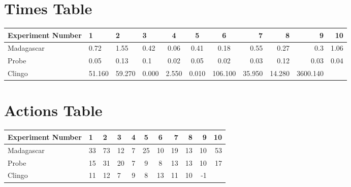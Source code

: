 \documentclass[8pt]{article}
\begin{document}
\begin{landscape}
\section{Times Table}\begin{tabular}{ | l | l | l | l | c | c | c | r | r | r | r | }\hline
Experiment Number & 1 & 2 & 3 & 4 & 5 & 6 & 7 & 8 & 9 & 10\\  \hline
Madagascar & 0.72 & 1.55 & 0.42 & 0.06 & 0.41 & 0.18 & 0.55 & 0.27 & 0.3 & 1.06\\  \hline
Probe & 0.05 & 0.13 & 0.1 & 0.02 & 0.05 & 0.02 & 0.03 & 0.12 & 0.03 & 0.04\\  \hline
Clingo & 51.160 & 59.270 & 0.000 & 2.550 & 0.010 & 106.100 & 35.950 & 14.280 & 3600.140\\  \hline
\end{tabular}
\section{Actions Table}\begin{tabular}{ | l | l | l | l | c | c | c | r | r | r | r | }\hline
Experiment Number & 1 & 2 & 3 & 4 & 5 & 6 & 7 & 8 & 9 & 10\\ \hline
 Madagascar & 33 & 73 & 12 & 7 & 25 & 10 & 19 & 13 & 10 & 53\\ \hline
 Probe & 15 & 31 & 20 & 7 & 9 & 8 & 13 & 13 & 10 & 17\\ \hline
 Clingo & 11 & 12 & 7 & 9 & 8 & 13 & 11 & 10 & -1\\ \hline
\end{tabular}
\end{landscape}
\end{document}
